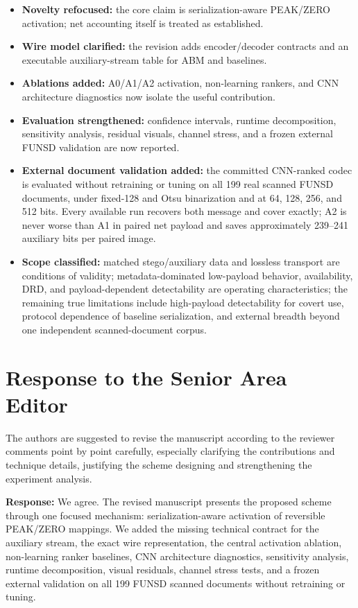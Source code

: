 \documentclass[11pt]{article}
\newcommand{\response}{\noindent\textbf{Response:} }
\begin{document}
\begin{itemize}
  \item \textbf{Novelty refocused:} the core claim is serialization-aware PEAK/ZERO activation; net accounting itself is treated as established.
  \item \textbf{Wire model clarified:} the revision adds encoder/decoder contracts and an executable auxiliary-stream table for ABM and baselines.
  \item \textbf{Ablations added:} A0/A1/A2 activation, non-learning rankers, and CNN architecture diagnostics now isolate the useful contribution.
  \item \textbf{Evaluation strengthened:} confidence intervals, runtime decomposition, sensitivity analysis, residual visuals, channel stress, and a frozen external FUNSD validation are now reported.
  \item \textbf{External document validation added:} the committed CNN-ranked codec is evaluated without retraining or tuning on all 199 real scanned FUNSD documents, under fixed-128 and Otsu binarization and at 64, 128, 256, and 512 bits. Every available run recovers both message and cover exactly; A2 is never worse than A1 in paired net payload and saves approximately 239--241 auxiliary bits per paired image.
  \item \textbf{Scope classified:} matched stego/auxiliary data and lossless transport are conditions of validity; metadata-dominated low-payload behavior, availability, DRD, and payload-dependent detectability are operating characteristics; the remaining true limitations include high-payload detectability for covert use, protocol dependence of baseline serialization, and external breadth beyond one independent scanned-document corpus.
\end{itemize}

\section*{Response to the Senior Area Editor}

\begin{reviewercomment}
The authors are suggested to revise the manuscript according to the reviewer comments point by point carefully, especially clarifying the contributions and technique details, justifying the scheme designing and strengthening the experiment analysis.
\end{reviewercomment}

\response We agree. The revised manuscript presents the proposed scheme through one focused mechanism: serialization-aware activation of reversible PEAK/ZERO mappings. We added the missing technical contract for the auxiliary stream, the exact wire representation, the central activation ablation, non-learning ranker baselines, CNN architecture diagnostics, sensitivity analysis, runtime decomposition, visual residuals, channel stress tests, and a frozen external validation on all 199 FUNSD scanned documents without retraining or tuning.
\end{document}
